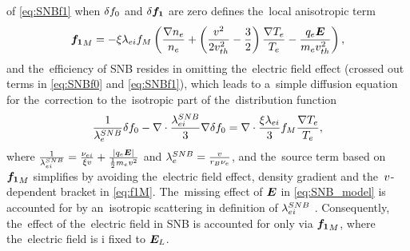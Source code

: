 of \eqref{eq:SNBf1} when $\delta f_0$ and $\delta {\boldsymbol{f_1}}$ are zero
defines the~local anisotropic term
\begin{equation}
  {\boldsymbol{f_1}}_M = -\xi\lambda_{ei}f_M\left( \frac{\nabla n_e}{n_e} 
+ \left( \frac{v^2}{2v_{th}^2} - \frac{3}{2}\right)
\frac{\nabla T_e}{T_e} - \frac{q_e\boldsymbol{E}}{m_ev_{th}^2}\right) ,
  \label{eq:f1M}
\end{equation}
and the~efficiency of SNB resides in omitting the~electric field 
effect (crossed out terms in \eqref{eq:SNBf0} and \eqref{eq:SNBf1}), which
leads to a~simple diffusion equation for the~correction to the~isotropic 
part of the~distribution function
\begin{equation}
  \frac{1}{\lambda_e^{SNB}}\delta f_0 
  - \nabla\cdot\frac{\lambda_{ei}^{SNB}}{3}\nabla\delta f_0 =
  \nabla\cdot\frac{\xi\lambda_{ei}}{3}f_M\frac{\nabla T_e}{T_e}
  ,
  \label{eq:SNB_model}
\end{equation}
where $\frac{1}{\lambda_{ei}^{SNB}} = 
\frac{\nu_{ei}}{\xi v} + \frac{|q_e\boldsymbol{E}|}{\frac{1}{2}m_ev^2}$ 
and $\lambda_e^{SNB} = \frac{v}{r_B \nu_{e}}$, and the~source term based on 
${\boldsymbol{f_1}}_M$ simplifies by avoiding the~electric field effect, density gradient 
and the~$v$-dependent bracket in \eqref{eq:f1M}. The~missing
effect of $\boldsymbol{E}$ in \eqref{eq:SNB_model} is accounted for by 
an~isotropic scattering in definition of $\lambda_{ei}^{SNB}$ \cite{Schurtz_2000}.
Consequently, the~effect of the~electric field in SNB
is accounted for only via ${\boldsymbol{f_1}}_M$, where the~electric field is i
fixed to $\boldsymbol{E}_L$. 

